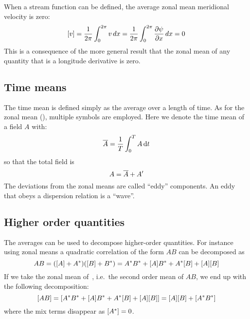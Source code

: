 When a stream function can be defined, the average zonal mean meridional
velocity is zero:
\begin{equation}
	[v] = \frac{1}{2\pi}\int_0^{2\pi} v \, dx=\frac{1}{2\pi}\int_0^{2\pi} \frac{\partial \psi}{\partial x} \, dx=0
	\label{eq:zonal-mean-v}
\end{equation}
This is a consequence of the more general result that the zonal mean of
any quantity that is a longitude derivative is zero.

\subsection{Time means}\label{subsec:time-mean}
The time mean is defined simply as the average over a length of time.
As for the zonal mean (\eq{\ref{eq:zonal-mean-def}}), multiple symbols are employed.
Here we denote the time mean of a field $A$ with:
\begin{equation}
	\overline{A} = \frac{1}{T}\int_0^{T} A \,\mathrm{d}t
	\label{eq:time-mean-def}
\end{equation}
so that the total field is
\begin{equation}
	A = \overline{A} + A'
	\label{eq:field-time-mean-decomp}
\end{equation}
The deviations from the zonal means are called ``eddy'' components. An
eddy that obeys a dispersion relation is a ``wave''.

\subsection{Higher order quantities}\label{subsec:higher-order-means}

The averages can be used to decompose higher-order quantities. For
instance using zonal means a quadratic correlation of the form \(A B\)
can be decomposed as
\begin{equation}
	A B = ([A]+A^*)([B]+B^*) = A^*B^* + [A] B^*+ A^*[B] + [A][B]
	\label{eq:decomp-AB-zonal}
\end{equation}
If we take the zonal mean of~\eq{\ref{eq:decomp-AB-zonal}}, i.e.~the second order mean of $AB$,
we end up with the following decomposition:
\begin{equation}
	[AB]= [A^*B^* + [A] B^* + A^* [B] + [A][B]] =
	[A][B] + [A^*B^*]
	\label{eq:decomp-AB-zonal-2nd-ord}
\end{equation}
where the mix terms disappear as $[A^*] = 0$.

